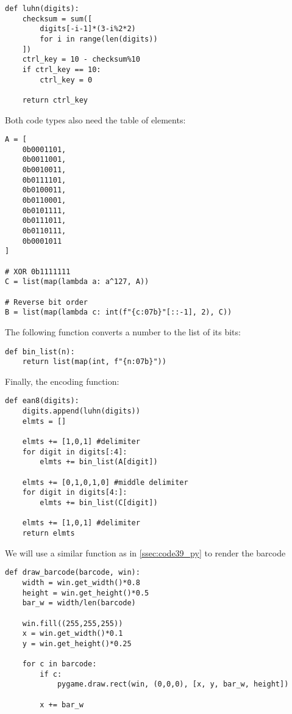 \begin{verbatim}
def luhn(digits):
    checksum = sum([
        digits[-i-1]*(3-i%2*2)
        for i in range(len(digits))
    ])
    ctrl_key = 10 - checksum%10
    if ctrl_key == 10:
        ctrl_key = 0

    return ctrl_key
\end{verbatim}

Both code types also need the table of elements:

\begin{verbatim}
A = [
    0b0001101,
    0b0011001,
    0b0010011,
    0b0111101,
    0b0100011,
    0b0110001,
    0b0101111,
    0b0111011,
    0b0110111,
    0b0001011
]

# XOR 0b1111111
C = list(map(lambda a: a^127, A))

# Reverse bit order
B = list(map(lambda c: int(f"{c:07b}"[::-1], 2), C))
\end{verbatim}

The following function converts a number to the list of its bits:
\begin{verbatim}
def bin_list(n):
    return list(map(int, f"{n:07b}"))
\end{verbatim}

Finally, the encoding function:
\begin{verbatim}
def ean8(digits):
    digits.append(luhn(digits))
    elmts = []

    elmts += [1,0,1] #delimiter
    for digit in digits[:4]:
        elmts += bin_list(A[digit])

    elmts += [0,1,0,1,0] #middle delimiter
    for digit in digits[4:]:
        elmts += bin_list(C[digit])

    elmts += [1,0,1] #delimiter
    return elmts
\end{verbatim}

We will use a similar function as in \autoref{ssec:code39_py} to render the barcode

\begin{verbatim}
def draw_barcode(barcode, win):
    width = win.get_width()*0.8
    height = win.get_height()*0.5
    bar_w = width/len(barcode)

    win.fill((255,255,255))
    x = win.get_width()*0.1
    y = win.get_height()*0.25

    for c in barcode:
        if c:
            pygame.draw.rect(win, (0,0,0), [x, y, bar_w, height])

        x += bar_w
\end{verbatim}

